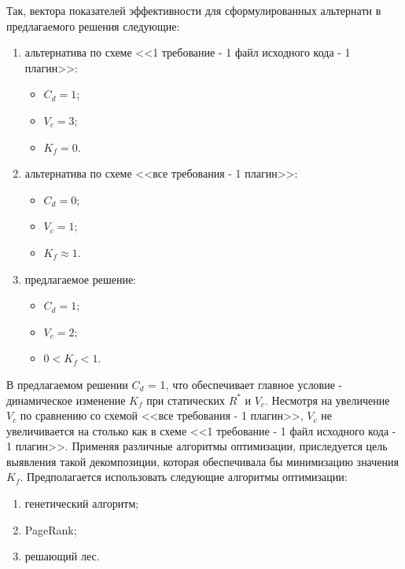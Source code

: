 Так, вектора показателей эффективности для сформулированных альтернати в предлагаемого решения следующие:
\begin{enumerate}
    \item альтернатива по схеме <<1 требование - 1 файл исходного кода - 1 плагин>>:
    \begin{itemize}
        \item $C_{d} = 1$;
        \item $V_{c} = 3$;
        \item $K_{f} = 0$.
    \end{itemize}
    \item альтернатива по схеме <<все требования - 1 плагин>>:
    \begin{itemize}
        \item $C_{d} = 0$;
        \item $V_{c} = 1$;
        \item $K_{f} \approx 1$.
    \end{itemize}
    \item предлагаемое решение:
    \begin{itemize}
        \item $C_{d} = 1$;
        \item $V_{c} = 2$;
        \item $0 < K_{f} < 1$.
    \end{itemize}
\end{enumerate}

В предлагаемом решении $C_{d}$ = 1, что обеспечивает главное условие - динамическое изменение $K_{f}$ при статических $R^{*}$ и $V_{c}$. Несмотря на увеличение $V_{c}$ по сравнению со схемой <<все требования - 1 плагин>>, $V_{c}$ не увеличивается на столько как в схеме <<1 требование - 1 файл исходного кода - 1 плагин>>. Применяя различные алгоритмы оптимизации, приследуется цель выявления такой декомпозиции, которая обеспечивала бы минимизацию значения $K_{f}$. Предполагается использовать следующие алгоритмы оптимизации:
\begin{enumerate}
    \item генетический алгоритм;
    \item PageRank;
    \item решающий лес.
\end{enumerate}